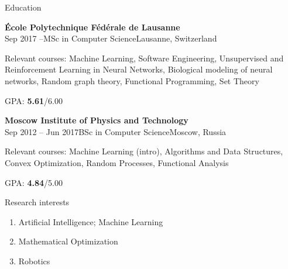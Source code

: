 \documentclass{resume} %
\begin{document}
\begin{rSection}{Education}
\begin{rSubsection}{\bf \'Ecole Polytechnique F\'ed\'erale de Lausanne}{\\Sep 2017 --}{MSc in Computer Science}{Lausanne, Switzerland}
\item Relevant courses: Machine Learning, Software Engineering,
{\small Unsupervised and Reinforcement Learning in Neural Networks, Biological modeling of neural networks, Random graph theory, Functional Programming, Set Theory}
\item GPA: {\bf 5.61}/6.00
\end{rSubsection}

\begin{rSubsection}{\bf Moscow Institute of Physics and Technology}{\\Sep 2012 -- Jun 2017}{BSc in Computer Science}{Moscow, Russia}
\item Relevant courses: Machine Learning (intro), Algorithms and Data Structures, Convex Optimization, Random Processes, Functional Analysis
\item GPA: {\bf 4.84}/5.00
\end{rSubsection}
\end{rSection}

\begin{rSection}{Research interests}
\begin{enumerate}
\item Artificial Intelligence; Machine Learning
\item Mathematical Optimization
\item Robotics
\end{enumerate}
\end{rSection}
\end{document}
